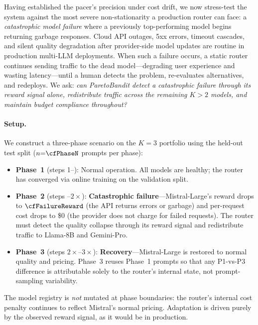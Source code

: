Having established the pacer's precision under cost drift, we now stress-test the system against the most severe non-stationarity a production router can face: a \emph{catastrophic model failure} where a previously top-performing model begins returning garbage responses.
Cloud API outages, 5xx errors, timeout cascades, and silent quality degradation after provider-side model updates are routine in production multi-LLM deployments.
When such a failure occurs, a static router continues sending traffic to the dead model---degrading user experience and wasting latency---until a human detects the problem, re-evaluates alternatives, and redeploys.
We ask: \emph{can ParetoBandit detect a catastrophic failure through its reward signal alone, redistribute traffic across the remaining $K{>}2$ models, and maintain budget compliance throughout?}

\paragraph{Setup.}
We construct a three-phase scenario on the $K{=}3$ portfolio using the held-out test split ($n{=}\cfPhaseN$ prompts per phase):

\begin{itemize}[nosep,leftmargin=*]
  \item \textbf{Phase~1} (steps 1--\cfPhaseN): Normal operation.
    All models are healthy; the router has converged via online training on the validation split.
  \item \textbf{Phase~2} (steps \cfPhaseN--$2{\times}$\cfPhaseN): \textbf{Catastrophic failure}---Mistral-Large's reward drops to $\cfFailureReward$ (the API returns errors or garbage) and per-request cost drops to \$0 (the provider does not charge for failed requests).
    The router must detect the quality collapse through its reward signal and redistribute traffic to Llama-8B and Gemini-Pro.
  \item \textbf{Phase~3} (steps $2{\times}$\cfPhaseN--$3{\times}$\cfPhaseN): \textbf{Recovery}---Mistral-Large is restored to normal quality and pricing.
    Phase~3 reuses Phase~1 prompts so that any P1-vs-P3 difference is attributable solely to the router's internal state, not prompt-sampling variability.
\end{itemize}

The model registry is \emph{not} mutated at phase boundaries: the router's internal cost penalty continues to reflect Mistral's normal pricing.
Adaptation is driven purely by the observed reward signal, as it would be in production.

